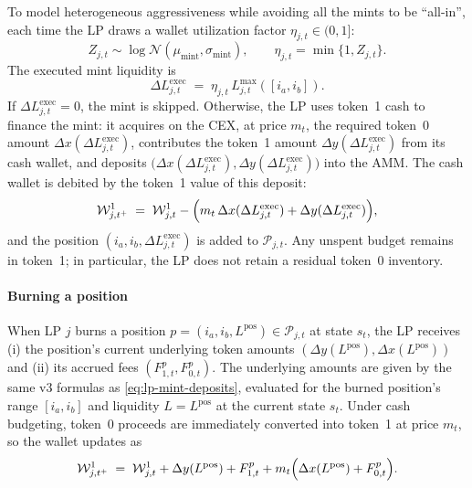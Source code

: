 \documentclass[11pt]{article}
\begin{document}
To model heterogeneous aggressiveness while avoiding all the mints to be ``all-in'', each time the LP draws
a wallet utilization factor $\eta_{j,t}\in(0,1]$:
\begin{equation}
  Z_{j,t}\sim \log\mathcal{N}(\mu_{\mathrm{mint}},\sigma_{\mathrm{mint}}),\qquad
  \eta_{j,t}=\min\{1,Z_{j,t}\}.
  \label{eq:lp-utilization}
\end{equation}
The executed mint liquidity is
\begin{equation}
  \Delta L^{\text{exec}}_{j,t} \;=\; \eta_{j,t}\,L^{\max}_{j,t}([i_a,i_b]).
  \label{eq:lp-mint-executed}
\end{equation}
If $\Delta L^{\text{exec}}_{j,t}=0$, the mint is skipped. Otherwise, the LP uses token~1 cash to finance the mint: it
acquires on the CEX, at price $m_t$, the required token~0 amount $\Delta x(\Delta L^{\text{exec}}_{j,t})$, contributes the
token~1 amount $\Delta y(\Delta L^{\text{exec}}_{j,t})$ from its cash wallet, and deposits
$\bigl(\Delta x(\Delta L^{\text{exec}}_{j,t}),\Delta y(\Delta L^{\text{exec}}_{j,t})\bigr)$ into the AMM.
The cash wallet is debited by the token~1 value of this deposit:
\begin{equation}
  \mathcal{W}^1_{j,t^+}
  \;=\;
  \mathcal{W}^1_{j,t}
  -
  \Bigl(
    m_t\,\Delta x(\Delta L^{\text{exec}}_{j,t})
    +
    \Delta y(\Delta L^{\text{exec}}_{j,t})
  \Bigr),
  \label{eq:lp-wallet-debit-cash}
\end{equation}
and the position $(i_a,i_b,\Delta L^{\text{exec}}_{j,t})$ is added to $\mathcal{P}_{j,t}$. Any unspent budget
remains in token~1; in particular, the LP does not retain a residual token~0 inventory.

\paragraph{Burning a position}

When LP $j$ burns a position $p=(i_a,i_b,L^{\mathrm{pos}})\in\mathcal{P}_{j,t}$ at state $s_t$, the LP receives
(i) the position's current underlying token amounts $\left(\Delta y(L^{\mathrm{pos}}), \Delta x(L^{\mathrm{pos}})\right)$ and
(ii) its accrued fees $\left(F^{p}_{1,t}, F^{p}_{0,t}\right)$.
The underlying amounts are given by the same v3 formulas as \eqref{eq:lp-mint-deposits}, evaluated for the burned
position's range $[i_a,i_b]$ and liquidity $L=L^{\mathrm{pos}}$ at the current state $s_t$.
Under cash budgeting, token~0 proceeds are immediately converted into token~1 at price $m_t$, so the wallet
updates as
\begin{equation}
  \mathcal{W}^1_{j,t^+}
  \;=\;
  \mathcal{W}^1_{j,t}
  +
  \Delta y(L^{\mathrm{pos}})
  +
  F^{p}_{1,t}
  +
  m_t\Bigl(\Delta x(L^{\mathrm{pos}})+F^{p}_{0,t}\Bigr).
  \label{eq:lp-wallet-credit-cash}
\end{equation}
\end{document}
